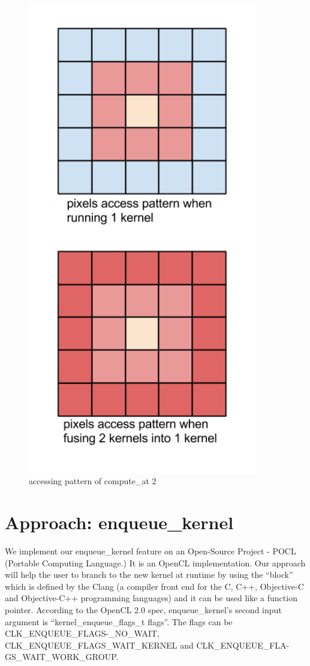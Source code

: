 \begin{figure}[hbtp]
\centering
\includegraphics[width=10cm]{img/figure4.png}
\caption{accessing pattern of compute\_at 2}
\label{fig:my_label5}
\end{figure}

\section{Approach: enqueue\_kernel}
    We implement our enqueue\_kernel feature on an Open-Source Project - POCL (Portable Computing Language.) It is an OpenCL implementation. Our approach will help the user to branch to the new kernel at runtime by using the “block” which is defined by the Clang\cite{clangori} (a compiler front end for the C, C++, Objective-C and Objective-C++ programming languages) and it can be used like a function pointer. According to the OpenCL 2.0 spec, enqueue\_kernel’s second input argument is “kernel\_enqueue\_flags\_t flags”. The flags can be CLK\_ENQUEUE\_FLAGS-\_NO\_WAIT, CLK\_ENQUEUE\_FLAGS\_WAIT\_KERNEL and CLK\_ENQUEUE\_FLA-
GS\_WAIT\_WORK\_GROUP.


